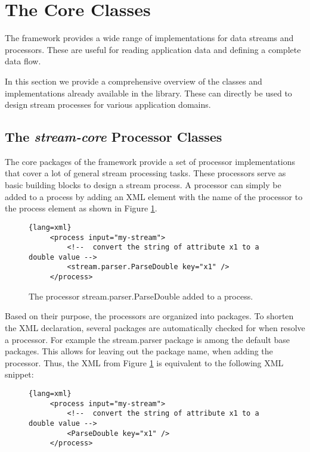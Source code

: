 \section{\label{sec:streamAPI}The \streams Core Classes}
The \streams framework provides a wide range of implementations for
data streams and processors. These are useful for reading application
data and defining a complete data flow.

In this section we provide a comprehensive overview of the classes and
implementations already available in the \streams library. These can
directly be used to design stream processes for various application
domains.



\subsection{The {\em stream-core} Processor Classes}

The core packages of the \streams framework provide a set of processor
implementations that cover a lot of general stream processing
tasks. These processors serve as basic building blocks to design a
stream process. A processor can simply be added to a process by adding
an XML element with the name of the processor to the process element
as shown in Figure \ref{fig:exampleProcessor}.

\begin{figure}[h!]
\centering
\begin{lstlisting}{lang=xml}
     <process input="my-stream">
         <!--  convert the string of attribute x1 to a double value -->
         <stream.parser.ParseDouble key="x1" />
     </process>
\end{lstlisting}
\caption{\label{fig:exampleProcessor}The processor {\ttfamily stream.parser.ParseDouble} added to a process.}
\end{figure}

Based on their purpose, the processors are organized into packages. To
shorten the XML declaration, several packages are automatically
checked for when resolve a processor. For example the {\ttfamily stream.parser} package is among the default base packages. This allows for leaving out the package name, when adding the processor. Thus, the XML from Figure \ref{fig:exampleProcessor} is equivalent to the following XML snippet:
\begin{figure}[h!]
\centering
\begin{lstlisting}{lang=xml}
     <process input="my-stream">
         <!--  convert the string of attribute x1 to a double value -->
         <ParseDouble key="x1" />
     </process>
\end{lstlisting}
\end{figure}

